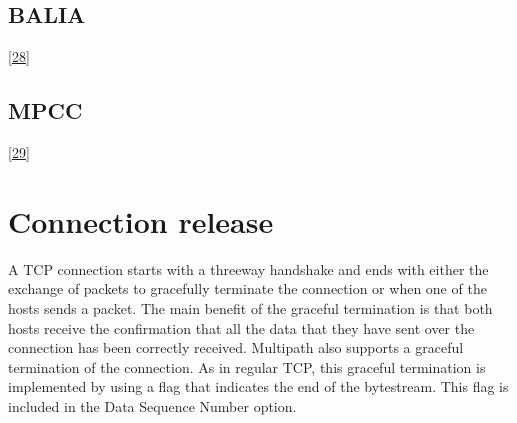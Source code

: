 \documentclass[letterpaper,10pt,english]{sphinxmanual}
\begin{document}
\subsection{BALIA}
\label{\detokenize{mptcp:balia}}
\sphinxAtStartPar
{[}\hyperlink{cite.biblio:id8993}{28}{]}


\subsection{MPCC}
\label{\detokenize{mptcp:mpcc}}
\sphinxAtStartPar
{[}\hyperlink{cite.biblio:id9002}{29}{]}


\section{Connection release}
\label{\detokenize{mptcp:connection-release}}\label{\detokenize{mptcp:mptcp-release}}
\sphinxAtStartPar
A TCP connection starts with a three\sphinxhyphen{}way handshake and ends with either the exchange of  packets to gracefully terminate the connection or when one of the hosts sends a  packet. The main benefit of the graceful termination is that both hosts receive the confirmation that all the data that they have sent over the connection has been correctly received. Multipath also supports a graceful termination of the connection. As in regular TCP, this graceful termination is implemented by using a flag that indicates the end of the bytestream. This flag is included in the Data Sequence Number option.
\end{document}
